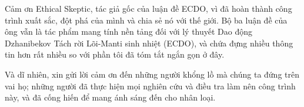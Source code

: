 \documentclass[10pt,twocolumn,letterpaper]{article}
\begin{document}
Cảm ơn Ethical Skeptic, tác giả gốc của luận đề ECDO, vì đã hoàn thành công trình xuất sắc, đột phá của mình và chia sẻ nó với thế giới. Bộ ba luận đề của ông \cite{1} vẫn là tác phẩm mang tính nền tảng đối với lý thuyết Dao động Dzhanibekov Tách rời Lõi-Manti sinh nhiệt (ECDO), và chứa đựng nhiều thông tin hơn rất nhiều so với phần tôi đã tóm tắt ngắn gọn ở đây.

Và dĩ nhiên, xin gửi lời cảm ơn đến những người khổng lồ mà chúng ta đứng trên vai họ; những người đã thực hiện mọi nghiên cứu và điều tra làm nên công trình này, và đã cống hiến để mang ánh sáng đến cho nhân loại.
\clearpage
\twocolumn

{\small
\renewcommand{\refname}{Tài liệu tham khảo}


}
\end{document}
